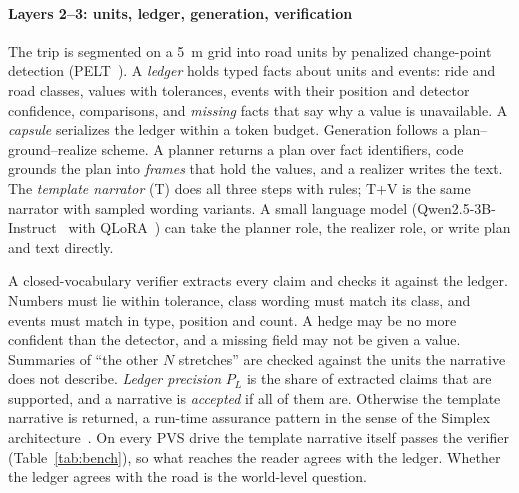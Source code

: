\paragraph*{Layers 2--3: units, ledger, generation, verification}
The trip is segmented on a 5~m grid into road units by penalized change-point detection (PELT~\cite{killick2012pelt}).
A \emph{ledger} holds typed facts about units and events: ride and road classes, values with tolerances, events with their position and detector confidence, comparisons, and \emph{missing} facts that say why a value is unavailable.
A \emph{capsule} serializes the ledger within a token budget.
Generation follows a plan--ground--realize scheme. A planner returns a plan over fact identifiers, code grounds the plan into \emph{frames} that hold the values, and a realizer writes the text.
The \emph{template narrator} (T) does all three steps with rules; T+V is the same narrator with sampled wording variants. A small language model (Qwen2.5-3B-Instruct~\cite{qwen25} with QLoRA~\cite{dettmers2023qlora}) can take the planner role, the realizer role, or write plan and text directly.

A closed-vocabulary verifier extracts every claim and checks it against the ledger.
Numbers must lie within tolerance, class wording must match its class, and events must match in type, position and count.
A hedge may be no more confident than the detector, and a missing field may not be given a value.
Summaries of ``the other $N$ stretches'' are checked against the units the narrative does not describe.
\emph{Ledger precision} $P_L$ is the share of extracted claims that are supported, and a narrative is \emph{accepted} if all of them are.
Otherwise the template narrative is returned, a run-time assurance pattern in the sense of the Simplex architecture~\cite{sha2001simplex}.
On every PVS drive the template narrative itself passes the verifier (Table~\ref{tab:bench}), so what reaches the reader agrees with the ledger. Whether the ledger agrees with the road is the world-level question.
